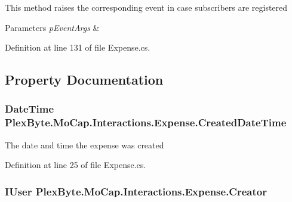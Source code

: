 This method raises the corresponding event in case subscribers are registered 


\begin{DoxyParams}{Parameters}
{\em p\+Event\+Args} & \\
\hline
\end{DoxyParams}


Definition at line 131 of file Expense.\+cs.



\subsection{Property Documentation}
\subsubsection[{\texorpdfstring{Created\+Date\+Time}{CreatedDateTime}}]{\setlength{\rightskip}{0pt plus 5cm}Date\+Time Plex\+Byte.\+Mo\+Cap.\+Interactions.\+Expense.\+Created\+Date\+Time\hspace{0.3cm}{\ttfamily [get]}}\hypertarget{class_plex_byte_1_1_mo_cap_1_1_interactions_1_1_expense_a32dd6eeb1125557a6ea5e749257c89e2}{}\label{class_plex_byte_1_1_mo_cap_1_1_interactions_1_1_expense_a32dd6eeb1125557a6ea5e749257c89e2}


The date and time the expense was created 



Definition at line 25 of file Expense.\+cs.

\subsubsection[{\texorpdfstring{Creator}{Creator}}]{\setlength{\rightskip}{0pt plus 5cm}I\+User Plex\+Byte.\+Mo\+Cap.\+Interactions.\+Expense.\+Creator\hspace{0.3cm}{\ttfamily [get]}}\hypertarget{class_plex_byte_1_1_mo_cap_1_1_interactions_1_1_expense_a4cddfba32109480eebc14f394570e61a}{}\label{class_plex_byte_1_1_mo_cap_1_1_interactions_1_1_expense_a4cddfba32109480eebc14f394570e61a}


